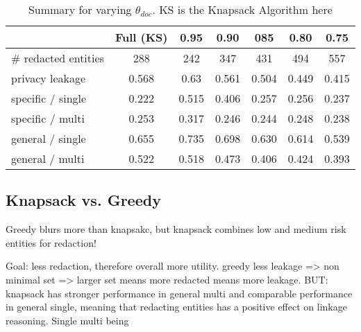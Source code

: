 \begin{table}[h!]
\centering
\caption{Summary for varying $\theta_{doc}$. KS is the Knapsack Algorithm here}
\label{discussion-tab:theta_doc_llm}
\begin{tabular}{l c c c c c c}
\toprule
\textbf{ } & \textbf{Full (KS)} & \textbf{0.95} &  \textbf{0.90} &  \textbf{085}&  \textbf{0.80} &  \textbf{0.75}\\
\midrule
\# redacted entities & 288 & 242 & 347 & 431 & 494 & 557 \\
\midrule
privacy leakage & 0.568 & 0.63 & 0.561 & 0.504 & 0.449 & 0.415 \\
\midrule
specific / single & 0.222 & 0.515 & 0.406 & 0.257 & 0.256 & 0.237 \\
specific / multi & 0.253 & 0.317 & 0.246 & 0.244 & 0.248 & 0.238 \\
general / single & 0.655 & 0.735 & 0.698 & 0.630 & 0.614 & 0.539 \\
general / multi & 0.522 & 0.518 & 0.473 & 0.406 & 0.424 & 0.393 \\

\bottomrule
\end{tabular}
\end{table}
 






\subsection{Knapsack vs. Greedy}
Greedy blurs more than knapsakc, but knapsack combines low and medium risk entities for redaction!

Goal: less redaction, therefore overall more utility. greedy less leakage => non minimal set => larger set means more redacted means more leakage. BUT: knapsack has stronger performance in general multi and comparable performance in general single, meaning that redacting entities has a positive effect on linkage reasoning. Single multi being 





